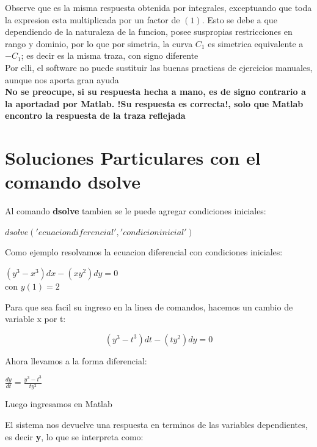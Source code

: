 \documentclass[10pt,a4paper]{article}
\begin{document}
Observe que es la misma respuesta obtenida por integrales, exceptuando que toda la expresion esta multiplicada por un factor de $(1)$. Esto se debe a que dependiendo de la naturaleza de la funcion, posee suspropias restricciones en rango y dominio, por lo que por simetria, la curva $C_1$ es simetrica equivalente a $-C_1$; es decir es la misma traza, con signo diferente
\\
Por elli, el software no puede sustituir las buenas practicas de ejercicios manuales, aunque nos aporta gran ayuda
\\
{\bf No se preocupe, si su respuesta hecha a mano, es de signo contrario a la aportadad por Matlab. !Su respuesta es correcta!, solo que Matlab encontro la respuesta de la traza reflejada}

\section*{Soluciones Particulares con el comando dsolve}

Al comando {\bf dsolve} tambien se le puede agregar condiciones iniciales:

\begin{center}
$dsolve('ecuacion diferencial','condicion inicial')$
\end{center}

Como ejemplo resolvamos la ecuacion diferencial con  condiciones iniciales:

\begin{center}
$(y^3-x^3)dx-(xy^2)dy=0$
\\
con $y(1)=2$
\end{center}

Para que sea facil su ingreso en la linea de comandos, hacemos un cambio de variable x por t:

\begin{center}
$$(y^3-t^3)dt-(ty^2)dy=0$$
\end{center}

Ahora llevamos a la forma diferencial:

\begin{center}
$\frac{dy}{dt}=\frac{y^3-t^3}{ty^2}$
\end{center}

Luego ingresamos en Matlab









El sistema nos devuelve una respuesta en terminos de las variables dependientes, es decir {\bf y}, lo que se interpreta como:
\end{document}
